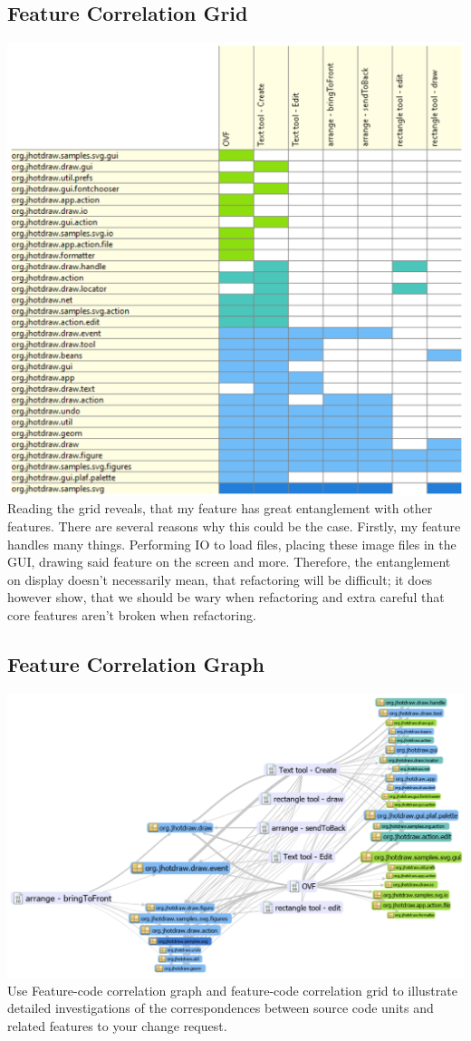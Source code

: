 \subsection{Feature Correlation Grid}
\includegraphics[width=\textwidth]{Images/featureousgrid.png}
Reading the grid reveals, that my feature has great entanglement with other features. There are several reasons why this could be the case. Firstly, my feature handles many things. Performing IO to load files, placing these image files in the GUI, drawing said feature on the screen and more. Therefore, the entanglement on display doesn't necessarily mean, that refactoring will be difficult; it does however show, that we should be wary when refactoring and extra careful that core features aren't broken when refactoring.
\subsection{Feature Correlation Graph}
\includegraphics[width=\textwidth]{Images/featureousgraph.png}
Use Feature-code correlation graph and feature-code correlation grid to illustrate detailed investigations of the correspondences between source code units and related features to your change request.

